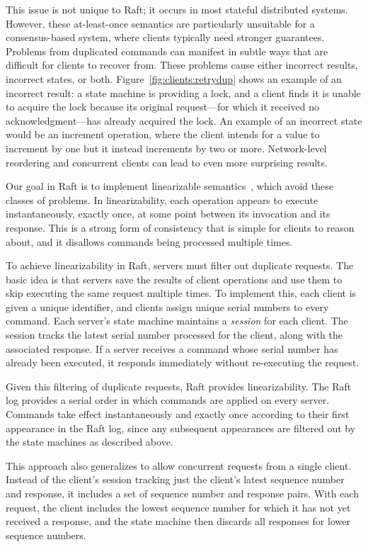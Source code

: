 This issue is not unique to Raft; it occurs in most stateful distributed
systems. However, these at-least-once semantics are particularly
unsuitable for a consensus-based system, where clients typically need
stronger guarantees. Problems from duplicated commands can manifest in
subtle ways that are difficult for clients to recover from. These
problems cause either incorrect results, incorrect states, or both.
Figure~\ref{fig:clients:retrydup} shows an example of an incorrect
result: a state machine is providing a lock, and
a client finds it is unable to acquire the lock because its
original request---for which it received no acknowledgment---has
already acquired the lock. An example of an incorrect state would be an
increment operation, where the client intends for a value to increment
by one but it instead increments by two or more. Network-level
reordering and concurrent clients can lead to even more surprising
results.

Our goal in Raft is to implement linearizable semantics~\cite{Herlihy:1990}, which avoid
these classes of problems. In linearizability, each operation appears to
execute instantaneously, exactly once, at some point between its
invocation and its response. This is a strong form of consistency that
is simple for clients to reason about, and it disallows commands being
processed multiple times.

To achieve linearizability in Raft, servers must filter out duplicate
requests. The basic idea is that servers save the results of
client operations and use them to skip executing the same request
multiple times.
To implement this, each client is given a unique
identifier, and clients assign unique serial numbers to every command.
Each server's state machine maintains a \emph{session} for each client.
The session tracks the latest serial number processed for the
client, along with the associated response. If a server receives a command
whose serial number has already been executed, it responds immediately
without re-executing the request.

Given this filtering of duplicate requests, Raft
provides linearizability. The Raft log provides a serial order in which
commands are applied on every server. Commands take effect
instantaneously and exactly once according to their first appearance in
the Raft log, since any subsequent appearances are filtered out by the
state machines as described above.

This approach also generalizes to allow concurrent requests from a
single client. Instead of the client's session tracking just the
client's latest sequence number and response, it includes a set of
sequence number and response pairs. With each request, the client
includes the lowest sequence number for which it has not yet received a
response, and the state machine then discards all responses for lower
sequence numbers.



